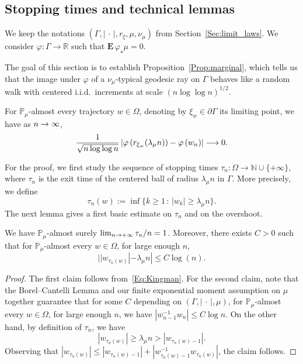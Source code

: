 \documentclass[AHL,Unicode,longabstracts,published]{cedram}
\newcommand{\N}{\mathbb{N}}
\newcommand{\R}{\mathbb{R}}
\renewcommand{\Pr}{\mathbb{P}}
\newcommand{\Eb}{\mathbf{E}\,}
\renewcommand{\(}{\left(}
\renewcommand{\)}{\right)}
\renewcommand*{\to}{\mathchoice{\longrightarrow}{\rightarrow}{\rightarrow}{\rightarrow}}
\begin{document}
\subsection{Stopping times and technical lemmas}

We keep the notations $(\Gamma, |\,\cdot\,|, r_{\xi}, \mu, \nu_{\mu})$ from Section~\ref{Sec:limit_laws}. We consider $\varphi : \Gamma\rightarrow \R$ such that $\Eb \varphi_{\star}\mu=0$.



The goal of this section is to establish Proposition~\ref{Prop:marginal}, which tells us that the image under $\varphi$ of a $\nu_{\mu}$-typical geodesic ray on $\Gamma$ behaves like a random walk with centered i.i.d.\ increments at scale $(n \log \log n)^{1/2}$.


\begin{prop}\label{Prop:marginal}
For $\Pr_\mu$-almost every trajectory $w\in \Omega$, denoting by $\xi_{w} \in \partial \Gamma$ its limiting point, we have as $n \to \infty$,
\[
\frac{1}{\sqrt{n\log \log n}} \left|\varphi\left(r_{\xi_{w}}(\lambda_\mu n)\right)-\varphi\left(w_n\right)\right| \to 0.
\]
\end{prop}

For the proof, we first study the sequence of stopping times $\tau_{n}: \Omega\rightarrow \N\cup \{+\infty\}$, where $\tau_{n}$ is the exit time of the centered ball of radius $\lambda_{\mu}n$ in $\Gamma$. More precisely, we define
\[
\tau_n(w) :=\inf\{k \ge 1 \, : \, |w_{k}| \ge \lambda_\mu n\}.
\]
The next lemma gives a first basic estimate on $\tau_{n}$ and on the overshoot.

\begin{lemm}\label{Lem:stopping_time-0}
We have $\Pr_{\mu}$-almost surely $\lim_{n\to +\infty }\tau_n /n= 1$. Moreover, there exists $C>0$ such that for $\Pr_{\mu}$-almost every $w\in \Omega$, for large enough $n$,
\[
| |w_{\tau_n(w)}|-\lambda_\mu n| \leq C\log(n).
\]
\end{lemm}

\begin{proof}
The first claim follows from~\eqref{Eq:Kingman}. For the second claim, note that the Borel--Cantelli Lemma and our finite exponential moment assumption on $\mu$ together guarantee that for some $C$ depending on $(\Gamma, |\,\cdot\,|, \mu)$, for $\Pr_{\mu}$-almost every $w\in \Omega$, for large enough $n$, we have $|w_{n-1}^{-1} w_n|\leq C \log n$. On the other hand, by definition of $\tau_n$, we have
\[
|w_{\tau_n(w)}|\ge \lambda_\mu n> |w_{\tau_n(w)-1}|.
\]
Observing that $|w_{\tau_n(w)}|\leq |w_{\tau_{n}(w)-1}|+ |w_{\tau_{n}(w)-1}^{-1} w_{\tau_{n}(w)}|$, the claim follows.
\end{proof}
\end{document}
